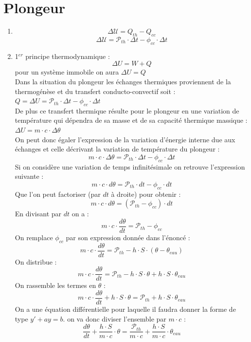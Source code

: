 \documentclass[a4paper,11pt,fleqn]{article}%
\begin{document}
	\maketitle
	\section{Plongeur}
	\begin{enumerate}
		\item $$\Delta \mathcal{U} =  Q_{th} - Q_{cc}$$ $$ \Delta \mathcal{U}  = \mathcal{P}_{th} \cdot \Delta t - \phi_{cc} \cdot \Delta t$$
		\item 1$^{er}$ principe thermodynamique : $$\Delta U = W + Q$$
		pour un système immobile on aura $\Delta U = Q$\\
		Dans la situation du plongeur les échanges thermiques proviennent de la thermogénèse et du transfert conducto-convectif soit : $Q =\Delta U= \mathcal{P}_{th} \cdot \Delta t - \phi_{cc} \cdot  \Delta t$\\
		De plus  ce transfert thermique résulte pour le plongeur en une variation de température qui dépendra de sa masse et de sa capacité thermique massique : $\Delta U = m \cdot c \cdot \Delta \theta$\\ 
		On peut donc égaler l'expression de la variation d'énergie interne due aux échanges et celle décrivant la variation de température du plongeur : $$ m \cdot c \cdot \Delta \theta =  \mathcal{P}_{th} \cdot \Delta t - \phi_{cc} \cdot \Delta t$$
		Si on considère une variation de temps infinitésimale on retrouve l'expression suivante : 
		$$ m \cdot c \cdot d \theta =  \mathcal{P}_{th} \cdot d t - \phi_{cc} \cdot d t$$
		Que l'on peut factoriser (par $dt$ à droite) pour obtenir :
		$$ m \cdot c \cdot d \theta =  (\mathcal{P}_{th} - \phi_{cc} )\cdot d t$$
		En divisant par $dt$ on a : 
		$$ m \cdot c \cdot \dfrac{d\theta}{dt} =  \mathcal{P}_{th} - \phi_{cc}$$
		On remplace $\phi_{cc}$ par son expression donnée dans l'énoncé :
		$$ m \cdot c \cdot \dfrac{d\theta}{dt} =  \mathcal{P}_{th} - h\cdot S\cdot (\theta - \theta_{eau})$$
		On distribue : 
		$$ m \cdot c \cdot \dfrac{d\theta}{dt} =  \mathcal{P}_{th} - h\cdot S \cdot \theta + h\cdot S \cdot \theta_{eau}$$
		On rassemble les termes en $\theta$ :
		$$ m \cdot c \cdot \dfrac{d\theta}{dt} + h\cdot S \cdot \theta=  \mathcal{P}_{th}  + h\cdot S \cdot \theta_{eau}$$
		On a une équation différentielle pour laquelle il faudra donner la forme de type $y' + ay = b$. on va donc diviser l'ensemble par $m \cdot c$ :
		$$ \dfrac{d\theta}{dt} + \dfrac{h\cdot S}{m \cdot c} \cdot \theta=  \dfrac{\mathcal{P}_{th}}{m \cdot c}  +\dfrac{ h\cdot S}{m \cdot c} \cdot \theta_{eau}$$

\end{enumerate}
\end{document}
